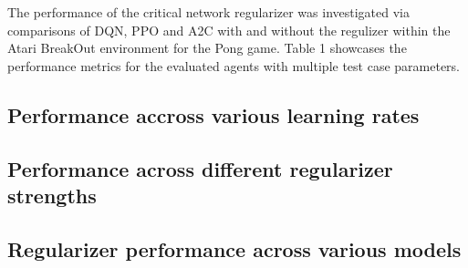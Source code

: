 The performance of the critical network regularizer was investigated via comparisons of DQN, PPO and A2C with and without the regulizer within the Atari BreakOut environment for the Pong game. Table 1 showcases the performance metrics for the evaluated agents with multiple test case parameters.

\subsection{Performance accross various learning rates}


\subsection{Performance across different regularizer strengths}

\subsection{Regularizer performance across various models}


